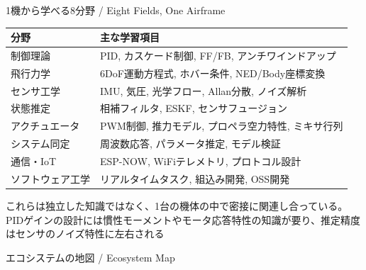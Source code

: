 \begin{frame}{1機から学べる8分野 / Eight Fields, One Airframe}
  \begin{table}
    \centering\scriptsize
    \begin{tabular}{ll}
      \hline
      \textbf{分野} & \textbf{主な学習項目} \\
      \hline
      制御理論       & PID, カスケード制御, FF/FB, アンチワインドアップ \\
      飛行力学       & 6DoF運動方程式, ホバー条件, NED/Body座標変換 \\
      センサ工学     & IMU, 気圧, 光学フロー, Allan分散, ノイズ解析 \\
      状態推定       & 相補フィルタ, ESKF, センサフュージョン \\
      アクチュエータ & PWM制御, 推力モデル, プロペラ空力特性, ミキサ行列 \\
      システム同定   & 周波数応答, パラメータ推定, モデル検証 \\
      通信・IoT      & ESP-NOW, WiFiテレメトリ, プロトコル設計 \\
      ソフトウェア工学 & リアルタイムタスク, 組込み開発, OSS開発 \\
      \hline
    \end{tabular}
  \end{table}

  \vspace{0.3em}

  {\small これらは独立した知識ではなく、1台の機体の中で密接に関連し合っている。PIDゲインの設計には慣性モーメントやモータ応答特性の知識が要り、推定精度はセンサのノイズ特性に左右される}
\end{frame}

\begin{frame}{エコシステムの地図 / Ecosystem Map}
  \centering
  \vspace{1mm}
  \resizebox{!}{0.78\textheight}{}
\end{frame}

